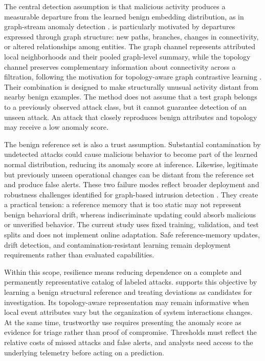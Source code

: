 The central detection assumption is that malicious activity produces a measurable departure from the learned benign embedding distribution, as in graph-stream anomaly detection \cite{manzoor2016streamspot}. \sysname{} is particularly motivated by departures expressed through graph structure: new paths, branches, changes in connectivity, or altered relationships among entities. The graph channel represents attributed local neighborhoods and their pooled graph-level summary, while the topology channel preserves complementary information about connectivity across a filtration, following the motivation for topology-aware graph contrastive learning \cite{chen2024topogcl}. Their combination is designed to make structurally unusual activity distant from nearby benign examples. The method does not assume that a test graph belongs to a previously observed attack class, but it cannot guarantee detection of an unseen attack. An attack that closely reproduces benign attributes and topology may receive a low anomaly score.

The benign reference set is also a trust assumption. Substantial contamination by undetected attacks could cause malicious behavior to become part of the learned normal distribution, reducing its anomaly score at inference. Likewise, legitimate but previously unseen operational changes can be distant from the reference set and produce false alerts. These two failure modes reflect broader deployment and robustness challenges identified for graph-based intrusion detection \cite{GNN_IDS}. They create a practical tension: a reference memory that is too static may not represent benign behavioral drift, whereas indiscriminate updating could absorb malicious or unverified behavior. The current study uses fixed training, validation, and test splits and does not implement online adaptation. Safe reference-memory updates, drift detection, and contamination-resistant learning remain deployment requirements rather than evaluated capabilities.

Within this scope, resilience means reducing dependence on a complete and permanently representative catalog of labeled attacks. \sysname{} supports this objective by learning a benign structural reference and treating deviations as candidates for investigation. Its topology-aware representation may remain informative when local event attributes vary but the organization of system interactions changes. At the same time, trustworthy use requires presenting the anomaly score as evidence for triage rather than proof of compromise. Thresholds must reflect the relative costs of missed attacks and false alerts, and analysts need access to the underlying telemetry before acting on a prediction.

